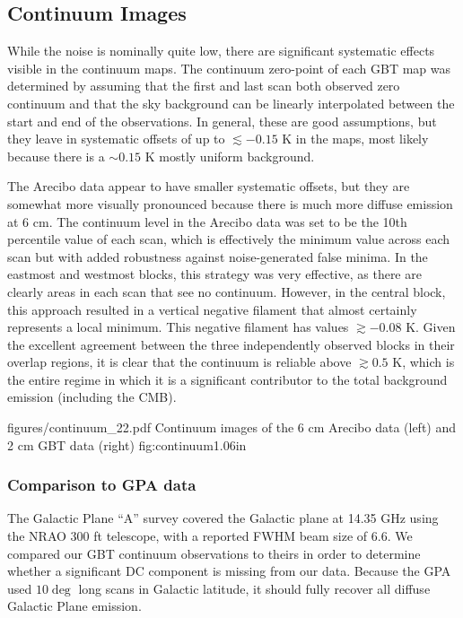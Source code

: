 \subsection{Continuum Images}

While the noise is nominally quite low, there are significant systematic
effects visible in the continuum maps.  The continuum zero-point of each GBT
map was determined by assuming that the first and last scan both observed zero
continuum and that the sky background can be linearly interpolated between the
start and end of the observations.  In general, these are good assumptions, but
they leave in systematic offsets of up to $\lesssim-0.15$ K in the maps, most
likely because there is a $\sim0.15$ K mostly uniform background.

The Arecibo data appear to have smaller systematic offsets, but they are
somewhat more visually pronounced because there is much more diffuse emission
at 6 cm.  The continuum level in the Arecibo data was set to be the 10th
percentile value of each scan, which is effectively the minimum value across
each scan but with added robustness against noise-generated false minima.  In
the eastmost and westmost blocks, this strategy was very effective, as there
are clearly areas in each scan that see no continuum.  However, in the central
block, this approach resulted in a vertical negative filament that almost
certainly represents a local minimum.  This negative filament has values
$\gtrsim-0.08$ K.  Given the excellent agreement between the three
independently observed blocks in their overlap regions, it is clear that the
continuum is reliable above $\gtrsim0.5$ K, which is the entire regime in which
it is a significant contributor to the total background emission (including the
CMB).

          {figures/continuum_22.pdf}
{Continuum images of the 6 cm Arecibo data (left) and 2 cm GBT data (right)}
{fig:continuum}{1.0}{6in}


\subsubsection{Comparison to GPA data}
\label{sec:gpacompare}
The Galactic Plane ``A'' survey \citep{Langston2000a} covered the Galactic
plane at 14.35 GHz using the NRAO 300 ft telescope, with a reported FWHM beam
size of 6.6\arcmin.  We compared our GBT continuum observations to theirs in
order to determine whether a significant DC component is missing from our data.
Because the GPA used $10\deg$ long scans in Galactic latitude, it should fully
recover all diffuse Galactic Plane emission.

